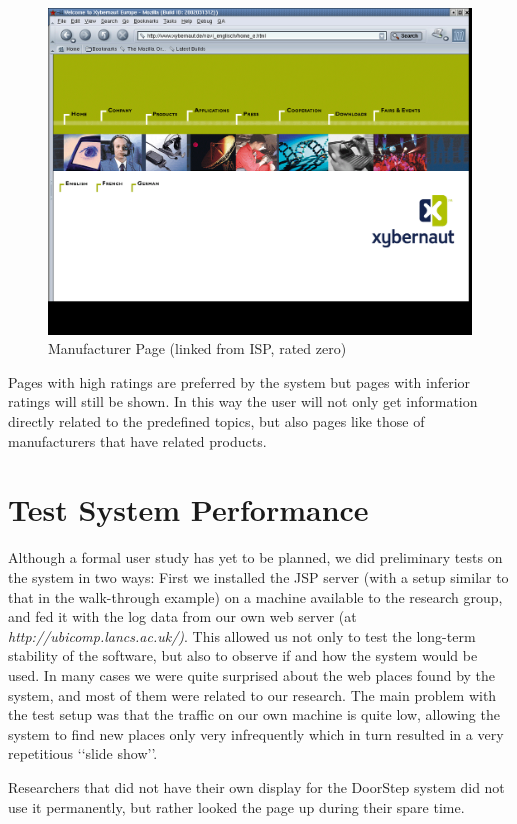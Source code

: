 \documentclass[a4paper,twoside]{danarticle}
\theoremstyle{remark}
\begin{document}
      \begin{figure}[ht]
        \centering
        \includegraphics[width=12cm]{xyberhome}
        \caption{Manufacturer Page (linked from ISP, rated zero)}
        \label{xyberhome}
      \end{figure}
      Pages with high
      ratings are preferred by the system but pages with inferior ratings will
      still be shown. In this way the user will not only get information
      directly related to the predefined topics, but also pages like those of
      manufacturers that have related products.
  \section{Test System Performance} 
    Although a formal user study has yet to be planned, we did 
    preliminary tests on the system in two ways: First we installed the JSP 
    server (with a setup similar to that in the walk-through example) 
    on a machine available to the research group, and fed it with the 
    log data from our own web server (at 
    \textit{http://ubicomp.lancs.ac.uk/)}. This allowed us not only to test 
    the long-term stability of the software, but also to observe if and how 
    the system would be used. In many cases we were quite surprised about 
    the web places found by the system, and most of them were related to our 
    research. The main problem with the test setup was that the traffic on 
    our own machine is quite low, allowing the system to find new places 
    only very infrequently which in turn resulted in a very repetitious 
    \lq\lq slide show\rq\rq .
    
    Researchers that did not have their own display 
    for the DoorStep system did not use it permanently, but rather looked 
    the page up during their spare time.
    
\end{document}
